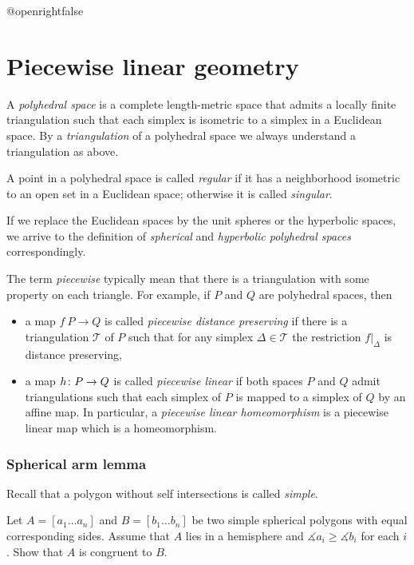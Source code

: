 \csname @openrightfalse\endcsname
\chapter{Piecewise linear geometry}


A \emph{polyhedral space} is a complete length-metric space that admits a locally finite triangulation 
such that each simplex is isometric to a simplex in a Euclidean space.
By a {}\emph{triangulation} of a polyhedral space we always understand a triangulation as above. 

A point in a polyhedral space is called \emph{regular} if it has a neighborhood isometric to an open set in a Euclidean space;
otherwise it is called {}\emph{singular}.

If we replace the Euclidean spaces by the unit spheres or the hyperbolic spaces,
we arrive to the definition of {}\emph{spherical} and {}\emph{hyperbolic polyhedral spaces} correspondingly.

The term \emph{piecewise} typically mean that there is a triangulation with some property on each triangle.
For example,  if $P$ and $Q$ are polyhedral spaces, then
\begin{itemize}
\item a map $f\:P\to Q$ is called {}\emph{piecewise distance preserving} if there is a triangulation $\mathcal{T}$ of $P$ such that for any simplex $\Delta\in \mathcal{T}$ the restriction $f|_\Delta$ is distance preserving,
\item a map $h\:P\z\to Q$  is called {}\emph{piecewise linear} if both spaces $P$ and $Q$ admit triangulations such that each simplex of $P$ is mapped to a simplex of $Q$ by an affine map.
In particular, a {}\emph{piecewise linear homeomorphism} is a piecewise linear map which is a homeomorphism.\label{piecewise linear map}
\end{itemize}





\subsection*{Spherical arm lemma}\label{Spherical arm lemma}

Recall that a polygon without self intersections is called \emph{simple}.

\begin{pr}
Let $A=[a_1\dots a_n]$ and $B=[b_1\dots b_n]$ be two simple spherical polygons 
with equal corresponding sides.
Assume that $A$ lies in a hemisphere and $\measuredangle a_i\ge\measuredangle b_i$ for each $i$.
Show that $A$ is congruent to $B$.
\end{pr}

